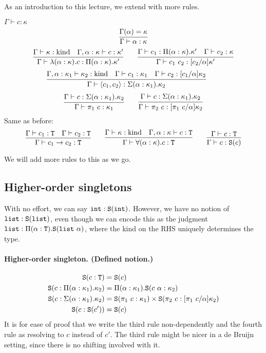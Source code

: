 
As an introduction to this lecture, we extend  with more rules.
\begin{judgment}
  $\Gamma \vdash c : \kappa$
  \[
    \infer{\Gamma \vdash \alpha : \kappa}{\Gamma(\alpha) = \kappa}
  \]
  \[
    \infer{\Gamma \vdash \lambda(\alpha : \kappa).c : \Pi(\alpha : \kappa).\kappa'}
      {\Gamma \vdash \kappa : \kind
      &\Gamma, \alpha : \kappa \vdash c : \kappa'
      }
    \qquad
    \infer{\Gamma \vdash c_1~c_2 : [c_2 / \alpha]\kappa'}
      {\Gamma \vdash c_1 : \Pi(\alpha:\kappa).\kappa'
      &\Gamma \vdash c_2 : \kappa
      }
  \]
  \[
    \infer{\Gamma \vdash \langle c_1, c_2 \rangle : \Sigma(\alpha : \kappa_1).\kappa_2}
      {\Gamma, \alpha : \kappa_1 \vdash \kappa_2 : \kind
      &\Gamma \vdash c_1 : \kappa_1
      &\Gamma \vdash c_2 : [c_1/\alpha]\kappa_2
      }
    \qquad
  \]
  \[
    \infer{\Gamma \vdash \pi_1~c : \kappa_1}
      {\Gamma \vdash c : \Sigma (\alpha : \kappa_1).\kappa_2}
    \qquad
    \infer{\Gamma \vdash \pi_2~c : [\pi_1~c/\alpha]\kappa_2}
      {\Gamma \vdash c : \Sigma (\alpha : \kappa_1).\kappa_2}
  \]
Same as before:
  \[
    \infer{\Gamma \vdash c_1 \to c_2 : \T}{\Gamma \vdash c_1 : \T & \Gamma \vdash c_2 : \T}
    \qquad
    \infer{\Gamma \vdash \forall(\alpha:\kappa).c : \T}
      {\Gamma \vdash \kappa : \kind
      &\Gamma, \alpha : \kappa \vdash c : \T
      }
    \qquad
    \infer{\Gamma \vdash c : \S(c)}
      {\Gamma \vdash c : \T}
  \]
\end{judgment}
We will add more rules to this as we go.

\subsection{Higher-order singletons}
With no effort, we can say $\int : \S(\int)$. However, we have no notion
of $\lst : \S(\lst)$, even though we can encode this as the judgment
$\lst : \Pi(\alpha : \T). \S(\lst~\alpha)$, where the kind on the RHS
uniquely determines the type.

\paragraph{Higher-order singleton. (Defined notion.)}
\begin{align*}
  \S(c : \T) &= \S(c)\\
  \S(c : \Pi(\alpha : \kappa_1).\kappa_2) &= \Pi(\alpha : \kappa_1).\S(c~\alpha : \kappa_2)\\
  \S(c : \Sigma(\alpha : \kappa_1).\kappa_2) &=
    \S(\pi_1~c : \kappa_1) \times \S(\pi_2~c : [\pi_1~c/\alpha]\kappa_2)\\
  \S(c : \S(c')) &= \S(c)
\end{align*}
It is for ease of proof that we write the third rule non-dependently and the
fourth rule as resolving to $c$ instead of $c'$. The third rule might be nicer in a
de Bruijn setting, since there is no shifting involved with it.

